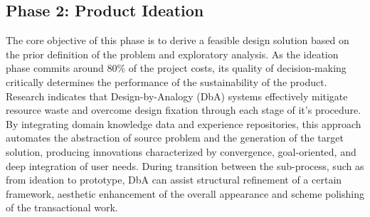 \subsection{Phase 2: Product Ideation}

The core objective of this phase is to derive a feasible design solution based on the prior definition of the problem and exploratory analysis. As the ideation phase commits around 80\% of the project costs, its quality of decision-making critically determines the performance of the sustainability of the product\cite{kerzner2025project}. Research indicates that Design-by-Analogy (DbA) systems effectively mitigate resource waste and overcome design fixation through each stage of it's procedure\cite{o2015toward}. By integrating domain knowledge data\cite{jiang2022data} and experience repositories, this approach automates the abstraction of source problem and the generation of the target solution, producing innovations characterized by convergence, goal-oriented, and deep integration of user needs\cite{fu2015design}. During transition between the sub-process, such as from ideation to prototype, DbA can assist structural refinement of a certain framework, aesthetic enhancement of the overall appearance and scheme polishing of the transactional work.


